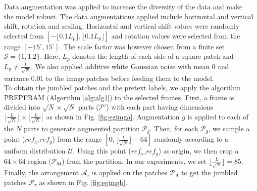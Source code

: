 \documentclass[journal]{IEEEtai}
\begin{document}
\indent
Data augmentation was applied to increase the diversity of the data and make the model robust. The data augmentations applied include horizontal and vertical shift, rotation and scaling. Horizontal and vertical shift values were randomly selected from $[-\lfloor0.1 L_p \rfloor,\lfloor0.1 L_p \rfloor]$ and rotation values were selected from the range $[-15^{\circ},15^{\circ}]$. The scale factor was however chosen from a finite set $\mathcal{S} = \{1,1.2\}$. Here, $L_p$ denotes the length of each side of a square patch and $L_p \neq \frac{L}{\sqrt{N}}$. We also applied additive white Gaussian noise with mean 0 and variance 0.01 to the image patches before feeding them to the model.\\
\indent To obtain the jumbled patches and the pretext labels, we apply the algorithm PREPFRAM (Algorithm \ref{alg:alg1}) to the selected frames. First, a frame is divided into $\sqrt{N} \times \sqrt{N}$ parts ($\mathcal{P}'$) with each part having dimensions $\lfloor \frac{L}{\sqrt{N}} \rfloor \times \lfloor \frac{L}{\sqrt{N}} \rfloor$ as shown in Fig. \ref{fig:egimga}. Augmentation $g$ is applied to each of the $N$ parts to generate augmented partition $\mathcal{P}_{g}$. Then, for each $\mathcal{P}_{g}$, we sample a point ($ref_{x}$,$ref_{y}$) from the range $[0,\lfloor \frac{L}{\sqrt{N}} \rfloor - 64]$ randomly according to a uniform distribution $\mathcal{U}$. Using this point ($ref_{x}$,$ref_{y}$) as origin, we then crop a $64 \times 64$ region ($\mathcal{P}_{64}$) from the partition. In our experiments, we set $\lfloor \frac{L}{\sqrt{N}} \rfloor = 85$. Finally, the arrangement $\mathcal{A}_{\tau}$ is applied on the patches $\mathcal{P}_{A}$ to get the jumbled patches $\mathcal{P}_{\tau}$ as shown in Fig. \ref{fig:egimgb}.
\end{document}
